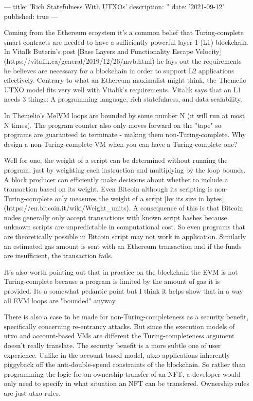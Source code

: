 ---
title: 'Rich Statefulness With UTXOs'
description: ''
date: '2021-09-12'
published: true
---

Coming from the Ethereum ecoystem it's a common belief that Turing-complete smart contracts are needed to have a sufficiently powerful layer 1 (L1) blockchain. In Vitalk Buterin's post [Base Layers and Functionality Escape Velocity](https://vitalik.ca/general/2019/12/26/mvb.html) he lays out the requirements he believes are necessary for a blockchain in order to support L2 applications effectively. Contrary to what an Ethereum maximalist might think, the Themelio UTXO model fits very well with Vitalik's requirements. Vitalik says that an L1 needs 3 things: A programming language, rich statefulness, and data scalability. 




In Themelio's MelVM loops are bounded by some number N (it will run at most N times). The program counter also only moves forward on the "tape" so programs are guaranteed to terminate - making them non-Turing-complete. Why design a non-Turing-complete VM when you can have a Turing-complete one?

Well for one, the weight of a script can be determined without running the program, just by weighting each instruction and multiplying by the loop bounds. A block producer can efficiently make decisions about whether to include a transaction based on its weight. Even Bitcoin although its scripting is non-Turing-complete only measures the weight of a script [by its size in bytes](https://en.bitcoin.it/wiki/Weight_units). A consequence of this is that Bitcoin nodes generally only accept transactions with known script hashes because unknown scripts are unpredictable in computational cost. So even programs that are theoretically possible in Bitcoin script may not work in application. Similarly an estimated gas amount is sent with an Ethereum transaction and if the funds are insufficient, the transaction fails.

It's also worth pointing out that in practice on the blockchain the EVM is not Turing-complete because a program is limited by the amount of gas it is provided. Its a somewhat pedantic point but I think it helps show that in a way all EVM loops are "bounded" anyway.

There is also a case to be made for non-Turing-completeness as a security benefit, specifically concerning re-entrancy attacks. But since the execution models of utxo and account-based VMs are different the Turing-completeness argument doesn't really translate. The security benefit is a more subtle one of user experience. Unlike in the account based model, utxo applications inherently piggyback off the anti-double-spend constraints of the blockchain. So rather than programming the logic for an ownership transfer of an NFT, a developer would only need to specify in what situation an NFT can be transfered. Ownership rules are just utxo rules.





